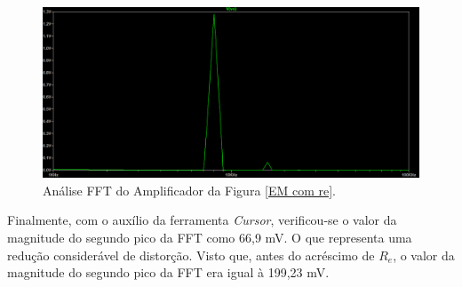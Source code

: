\documentclass[journal, a4paper]{IEEEtran}
\begin{document}
    	\begin{figure}[H]
    		\begin{center}
    		\includegraphics[width=\columnwidth]{fft_com_re.PNG}
    		\caption{Análise FFT do Amplificador da Figura \ref{EM com re}.}
    		\label{fft com re}
    		\end{center}
    	\end{figure}
    	
    \tab Finalmente, com o auxílio da ferramenta \textit{Cursor}, verificou-se o valor da magnitude do segundo pico da FFT como 66,9 mV. O que representa uma redução considerável de distorção. Visto que, antes do acréscimo de $R_e$, o valor da magnitude do segundo pico da FFT era igual à 199,23 mV.
        
\end{document}
